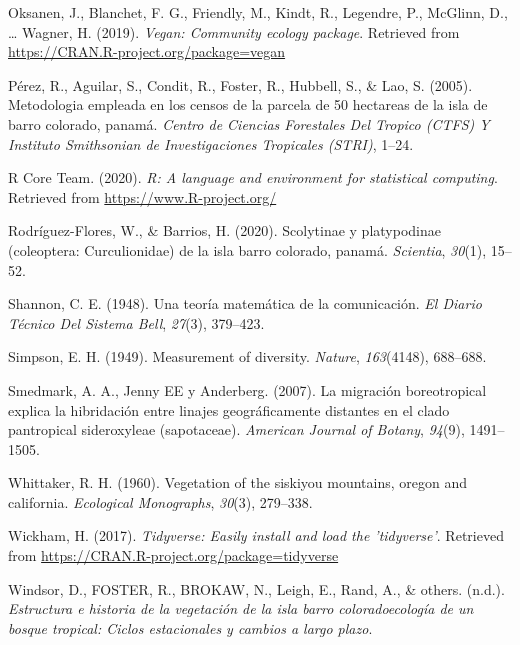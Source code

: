 \documentclass[11pt,]{article}
\begin{document}
\hypertarget{ref-vegan}{}
Oksanen, J., Blanchet, F. G., Friendly, M., Kindt, R., Legendre, P.,
McGlinn, D., \ldots{} Wagner, H. (2019). \emph{Vegan: Community ecology
package}. Retrieved from \url{https://CRAN.R-project.org/package=vegan}

\hypertarget{ref-perez2005metodologia}{}
Pérez, R., Aguilar, S., Condit, R., Foster, R., Hubbell, S., \& Lao, S.
(2005). Metodologia empleada en los censos de la parcela de 50 hectareas
de la isla de barro colorado, panamá. \emph{Centro de Ciencias
Forestales Del Tropico (CTFS) Y Instituto Smithsonian de Investigaciones
Tropicales (STRI)}, 1--24.

\hypertarget{ref-Restudio}{}
R Core Team. (2020). \emph{R: A language and environment for statistical
computing}. Retrieved from \url{https://www.R-project.org/}

\hypertarget{ref-rodriguez2020scolytinae}{}
Rodríguez-Flores, W., \& Barrios, H. (2020). Scolytinae y platypodinae
(coleoptera: Curculionidae) de la isla barro colorado, panamá.
\emph{Scientia}, \emph{30}(1), 15--52.

\hypertarget{ref-shannon1948mathematical}{}
Shannon, C. E. (1948). Una teoría matemática de la comunicación.
\emph{El Diario Técnico Del Sistema Bell}, \emph{27}(3), 379--423.

\hypertarget{ref-simpson1949measurement}{}
Simpson, E. H. (1949). Measurement of diversity. \emph{Nature},
\emph{163}(4148), 688--688.

\hypertarget{ref-smedmark2007boreotropical}{}
Smedmark, A. A., Jenny EE y Anderberg. (2007). La migración
boreotropical explica la hibridación entre linajes geográficamente
distantes en el clado pantropical sideroxyleae (sapotaceae).
\emph{American Journal of Botany}, \emph{94}(9), 1491--1505.

\hypertarget{ref-whittaker1960vegetation}{}
Whittaker, R. H. (1960). Vegetation of the siskiyou mountains, oregon
and california. \emph{Ecological Monographs}, \emph{30}(3), 279--338.

\hypertarget{ref-tidyverse}{}
Wickham, H. (2017). \emph{Tidyverse: Easily install and load the
'tidyverse'}. Retrieved from
\url{https://CRAN.R-project.org/package=tidyverse}

\hypertarget{ref-windsorestructura}{}
Windsor, D., FOSTER, R., BROKAW, N., Leigh, E., Rand, A., \& others.
(n.d.). \emph{Estructura e historia de la vegetación de la isla barro
coloradoecología de un bosque tropical: Ciclos estacionales y cambios a
largo plazo}.




\newpage
\singlespacing 
\end{document}
